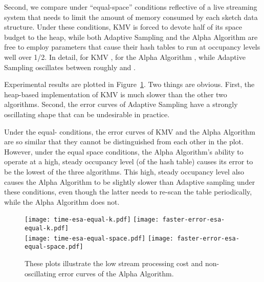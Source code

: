 \documentclass{article}
\begin{document}
Second, we compare under ``equal-space'' conditions reflective of a
live streaming system that needs to limit the amount of memory
consumed by each sketch data structure. Under these conditions, KMV is
forced to devote half of its space budget to the heap, while both
Adaptive Sampling and the Alpha Algorithm are free to employ
parameters that cause their hash tables to run at occupancy levels
well over 1/2.  In detail, for KMV , for the Alpha
Algorithm , while Adaptive Sampling oscillates between
roughly  and .

Experimental results are plotted in Figure~\ref{fig:base-algo-tradeoffs}. Two things
are obvious. First, the heap-based implementation of KMV
is much slower than the other two algorithms. Second, the error curves
of Adaptive Sampling have a strongly oscillating shape that can be 
undesirable in practice.

Under the equal- conditions, the error curves of KMV and the Alpha
Algorithm are so similar that they cannot be distinguished from each
other in the plot. However, under the equal space conditions, the
Alpha Algorithm's ability to operate at a high, steady occupancy level (of
the hash table) causes its error to be the lowest of the three
algorithms. This high, steady occupancy level also causes the Alpha Algorithm
to be slightly slower than Adaptive sampling under these conditions,
even though the latter needs to re-scan the table periodically, 
while the Alpha Algorithm does not.

\begin{figure}
\begin{center}
\texttt{[image: time-esa-equal-k.pdf]}\quad
\texttt{[image: faster-error-esa-equal-k.pdf]} \\
\texttt{[image: time-esa-equal-space.pdf]}\quad
\texttt{[image: faster-error-esa-equal-space.pdf]} \\
\end{center}
\caption{These plots illustrate the low stream processing cost and non-oscillating
error curves of the Alpha Algorithm.}
\label{fig:base-algo-tradeoffs}
\end{figure}
\end{document}
